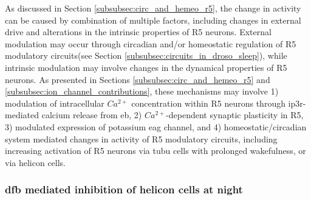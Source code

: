 \documentclass[../main.tex]{subfiles}
\begin{document}
As discussed in Section \ref{subsubsec:circ_and_hemeo_r5}, the change in activity can be caused by combination of multiple factors, including changes in external drive and alterations in the intrinsic properties of R5 neurons. External modulation may occur through circadian and/or homeostatic regulation of R5 modulatory circuits(see Section \ref{subsubsec:circuits_in_droso_sleep}), while intrinsic modulation may involve changes in the dynamical properties of R5 neurons. As presented in Sections \ref{subsubsec:circ_and_hemeo_r5} and \ref{subsubsec:ion_channel_contributions}, these mechanisms may involve 1) modulation of intracellular $Ca^{2+}$ concentration within R5 neurons through \gls{ip3r}-mediated calcium release from \gls{eb}, 2) $Ca^{2+}$-dependent synaptic plasticity in R5, 3) modulated expression of potassium \gls{eag} channel, and 4) homeostatic/circadian system mediated changes in activity of R5 modulatory circuits, including increasing activation of R5 neurons via \gls{tubu} cells with prolonged wakefulness, or via helicon cells.



\subsubsection{\texorpdfstring{\acrshort{dfb}}{dFB} mediated inhibition of helicon cells at night}
\end{document}
